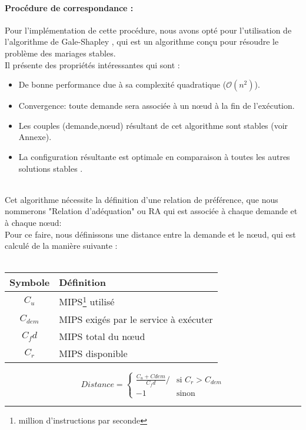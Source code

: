 \paragraph{Procédure de correspondance :}
Pour l'implémentation de cette procédure, nous avons opté pour l'utilisation de l'algorithme de Gale-Shapley \cite{gale-shapley}, qui est un algorithme conçu pour résoudre le problème des mariages stables.\\
Il présente des propriétés intéressantes qui sont :
\begin{itemize}
  \item De bonne performance due à sa complexité quadratique ($\mathcal{O}(n^2)$).
    \item Convergence: toute demande sera associée à un nœud à la fin de l'exécution.
    \item Les couples (demande,nœud) résultant de cet algorithme sont stables (voir Annexe).
    \item La configuration résultante est optimale en comparaison à toutes les autres solutions stables \cite{gale-shapley}.
\end{itemize} \\
Cet algorithme nécessite la définition d'une relation de préférence, que nous nommerons "Relation d'adéquation" ou RA qui est associée à chaque demande et à chaque nœud:\\
Pour ce faire, nous définissons une distance entre la demande et le nœud, qui est calculé de la manière suivante :
\\ \\
\begin{minipage}[t]{0.4\textwidth}
\begin{flushleft}
    \begin{tabular}{| c | p{4cm}|}
    \hline
    Symbole & Définition \\
    \hline
    $C_u$ & MIPS\footnote{million d'instructions par seconde} utilisé \\ 
    \hline
    $C_{dem}$ & MIPS exigés par le service à exécuter \\
    \hline
    $C_fd$ & MIPS total du nœud \\
    \hline
    $C_r$ & MIPS disponible \\
    \hline
    \end{tabular}
\end{flushleft}
\end{minipage}
%
\begin{minipage}[th]{0.4\textwidth}
\begin{flushright} 
\begin{center}
    $$Distance =\left \lbrace 
    \begin{array}{ll}
        \frac{C_u + Cdem}{C_fd}/ & \mbox{si $C_r > C_{dem}$}\\
        -1 & \mbox{sinon}
    \end{array}
\right.$$
\end{center}
\end{flushright}
\end{minipage}
